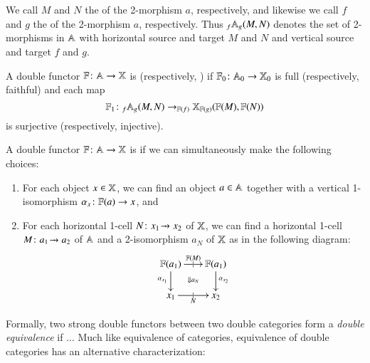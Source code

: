 \documentclass[reqno]{amsart}
\begin{document}
We call $M$ and $N$ the  of the 2-morphism $a$, respectively, and likewise we call $f$ and $g$ the  of the 2-morphism $a$, respectively. Thus $_f \mathbf{\mathbb A}_g(M,N)$ denotes the set of 2-morphisms in $\mathbf{\mathbb A}$ with horizontal source and target $M$ and $N$ and vertical source and target $f$ and $g$.

\begin{defn}\label{def:fullfaithful}
A double functor $\mathbf{\mathbb F} \colon \mathbf{\mathbb A} \to \mathbf{\mathbb X}$ is  (respectively, ) if $\mathbf{\mathbb F}_0 \colon \mathbf{\mathbb A}_0 \to \mathbf{\mathbb X}_0$ is full (respectively, faithful) and each map $$\mathbf{\mathbb F}_1 \colon _f \mathbf{\mathbb A}_g(M,N) \to _{\mathbf{\mathbb F}(f)} \mathbf{\mathbb X}_{\mathbf{\mathbb F}(g)}(\mathbf{\mathbb F}(M),\mathbf{\mathbb F}(N))$$ is surjective (respectively, injective).
\end{defn}
\begin{defn}\label{def:essentiallysurj}
A double functor $\mathbf{\mathbb F} \colon \mathbf{\mathbb A} \to \mathbf{\mathbb X}$ is  if we can simultaneously make the following choices:
\begin{enumerate}
\item{For each object $x \in \mathbf{\mathbb X}$, we can find an object $a \in \mathbf{\mathbb A}$ together with a vertical 1-isomorphism $\alpha_x \colon \mathbf{\mathbb F}(a) \to x$, and}
\item{For each horizontal 1-cell $N \maps x_1 \tobar x_2$  of $\mathbf{\mathbb X}$, we can find a horizontal 1-cell $M \maps a_1 \tobar a_2$ of $\mathbf{\mathbb A}$ and a 2-isomorphism $a_{N}$ of $\mathbf{\mathbb X}$ as in the following diagram:
\[
  \xymatrix@-.5pc{
    \lF(a_1) \ar[r]|{|}^{\lF(M)}  \ar[d]_{\alpha_{x_1}} \ar@{}[dr]|{\Downarrow a_N}&
    \lF(a_1) \ar[d]^{\alpha_{x_2}}\\
    x_1 \ar[r]|{|}_N & x_2
  }
\]
}
\end{enumerate}
\end{defn}

Formally, two strong double functors between two double categories form a \emph{double equivalence} if ...
Much like equivalence of categories, equivalence of double categories has an alternative characterization:
\end{document}
